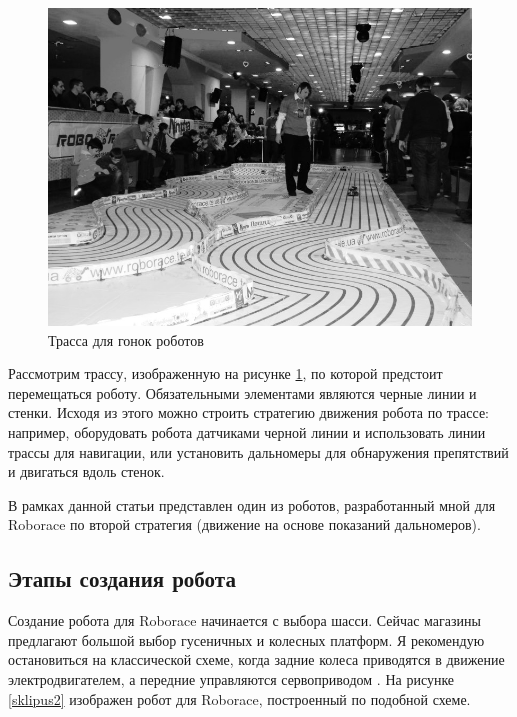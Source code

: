 \documentclass[10pt, a5paper]{article}
\begin{document}
\begin{figure}[h!]
  \centering 
  \includegraphics[scale=0.35]{12_2015_fig1}
  \caption{Трасса для гонок роботов}\label{sklipus1}
\end{figure}

Рассмотрим трассу, изображенную на рисунке \ref{sklipus1}, по которой предстоит перемещаться роботу. Обязательными элементами являются черные линии и стенки. Исходя из этого можно строить стратегию движения робота по трассе: например, оборудовать робота датчиками черной линии и использовать линии трассы для навигации, или установить дальномеры для обнаружения препятствий и двигаться вдоль стенок.

В рамках данной статьи представлен один из роботов, разработанный мной для Roborace по второй стратегия (движение на основе показаний дальномеров).

\subsection*{Этапы создания робота}

Создание робота для Roborace начинается с выбора шасси. Сейчас магазины предлагают большой выбор гусеничных и колесных платформ. Я рекомендую остановиться на классической схеме, когда задние колеса приводятся в движение электродвигателем, а передние управляются сервоприводом \cite{bib1}. На рисунке \ref{sklipus2} изображен робот для Roborace, построенный по подобной схеме.
\end{document}
